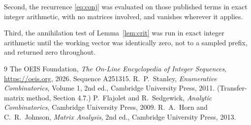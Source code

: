 \documentclass[11pt,a4paper]{article}
\theoremstyle{plain}
\theoremstyle{definition}
\begin{document}
Second, the recurrence \eqref{eq:conj} was evaluated on those published terms in exact
integer arithmetic, with no matrices involved, and vanishes wherever it applies.

Third, the annihilation test of Lemma~\ref{lem:crit} was run in exact integer arithmetic
until the working vector was identically zero, not to a sampled prefix, and returned zero
throughout.

\begin{thebibliography}{9}
 The OEIS Foundation, \emph{The On-Line Encyclopedia of Integer
Sequences}, \url{https://oeis.org}, 2026. Sequence A251315.
 R.~P.~Stanley, \emph{Enumerative Combinatorics}, Volume 1, 2nd ed.,
Cambridge University Press, 2011. (Transfer-matrix method, Section 4.7.)
 P.~Flajolet and R.~Sedgewick, \emph{Analytic Combinatorics}, Cambridge
University Press, 2009.
 R.~A.~Horn and C.~R.~Johnson, \emph{Matrix Analysis}, 2nd ed., Cambridge
University Press, 2013.
\end{thebibliography}
\end{document}
